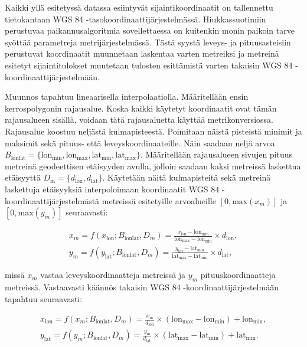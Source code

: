 \documentclass[
  12pt,
  a4paper, twoside]{book}
\begin{document}
Kaikki yllä esitetyssä datassa esiintyvät sijaintikoordinaatit on tallennettu tietokantaan WGS 84 -tasokoordinaattijärjestelmässä. Hiukkassuotimiin perustuvaa paikannusalgoritmia sovellettaessa on kuitenkin monin paikoin tarve syöttää parametreja metrijärjestelmässä. Tästä syystä leveys- ja pituusasteisiin perustuvat koordinaatit muunnetaan laskentaa varten metreiksi ja metreinä esitetyt sijaintitulokset muutetaan tulosten esittämistä varten takaisin WGS 84 -koordinaattijärjestelmään.

Muunnos tapahtuu lineaarisella interpolaatiolla. Määritellään ensin kerrospolygonin rajausalue. Koska kaikki käytetyt koordinaatit ovat tämän rajausalueen sisällä, voidaan tätä rajausaluetta käyttää metrikonversiossa. Rajausalue koostuu neljästä kulmapisteestä. Poimitaan näistä pisteistä minimit ja maksimit sekä pituus- että leveyskoordinaateille. Näin saadaan neljä arvoa \(B_{\text{lonlat}}=\{\text{lon}_{\text{min}}, \text{lon}_{\text{max}}, \text{lat}_{\text{min}}, \text{lat}_{\text{max}}\}\). Määritellään rajausalueen sivujen pituus metreinä geodeettisen etäisyyden avulla, jolloin saadaan kaksi metreissä laskettua etäisyyttä \(D_{\text{m}}=\{d_{\text{lon}}, d_{\text{lat}}\}\). Käytetään näitä kulmapisteitä sekä metreinä laskettuja etäisyyksiä interpoloimaan koordinaatit WGS 84 -koordinaattijärjestelmästä metreissä esitetyille arvoalueille \([0, \text{max}(x_m)]\) ja \([0, \text{max}(y_m)]\) seuraavasti:

\begin{align}\label{wgs84-m}
x_m = f(x_{\text{lon}}; B_{\text{lonlat}}, D_m) = \frac{x_{\text{lon}} -\text{lon}_{\text{min}}}{\text{lon}_{\text{max}}-\text{lon}_{\text{min}}} \times d_{\text{lon}},\\
y_m = f(y_{\text{lat}}; B_{\text{lonlat}}, D_m) = \frac{y_{\text{lat}} -\text{lat}_{\text{min}}}{\text{lat}_{\text{max}}-\text{lat}_{\text{min}}} \times d_{\text{lat}}
,\end{align}

\noindent missä \(x_m\) vastaa leveyskoordinaatteja metreissä ja \(y_m\) pituuskoordinaatteja metreissä. Vastaavasti käännös takaisin WGS 84 -koordinaattijärjestelmään tapahtuu seuraavasti:

\begin{align}\label{m-wgs84}
x_{\text{lon}} = f(x_m; B_{\text{lonlat}}, D_m) = \frac{x_{\text{m}}}{d_{\text{lon}}} \times (\text{lon}_{\text{max}}-\text{lon}_{\text{min}}) + \text{lon}_{\text{min}},\\
y_{\text{lat}} = f(y_m; B_{\text{lonlat}}, D_m) = \frac{y_{\text{m}}}{d_{\text{lat}}} \times (\text{lat}_{\text{max}}-\text{lat}_{\text{min}}) + \text{lat}_{\text{min}}
.\end{align}
\end{document}
